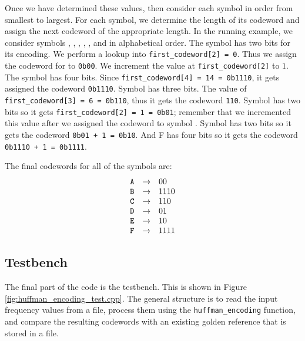 Once we have determined these values, then consider each symbol in order from smallest to largest. For each symbol, we determine the length of its codeword and assign the next codeword of the appropriate length.  In the running example, we consider symbols , , , , , and  in alphabetical order. The symbol  has two bits for its encoding. We perform a lookup into \lstinline{first_codeword[2] = 0}. Thus we assign the codeword for  to \lstinline{0b00}. We increment the value at \lstinline{first_codeword[2]} to $1$. The symbol  has four bits. Since \lstinline{first_codeword[4] = 14 = 0b1110}, it gets assigned the codeword \lstinline{0b1110}. Symbol  has three bits. The value of \lstinline{first_codeword[3] = 6 = 0b110}, thus it gets the codeword \lstinline{110}. Symbol  has two bits so it gets \lstinline{first_codeword[2] = 1 = 0b01}; remember that we incremented this value after we assigned the codeword to symbol . Symbol  has two bits so it gets the codeword \lstinline{0b01 + 1 = 0b10}. And F has four bits so it gets the codeword \lstinline{0b1110 + 1 = 0b1111}.

The final codewords for all of the symbols are:
\begin{equation}
\begin{array} {lll} 
\texttt{A} & \rightarrow & 00 \\
\texttt{B} & \rightarrow & 1110\\
\texttt{C} & \rightarrow  & 110 \\
\texttt{D} & \rightarrow & 01 \\
\texttt{E} & \rightarrow & 10\\
\texttt{F} & \rightarrow & 1111\\
\end{array}
\label{eq:codewords}
\end{equation}

\subsection{Testbench}
\label{sec:huffman_testbench}

The final part of the code is the testbench. This is shown in Figure \ref{fig:huffman_encoding_test.cpp}. The general structure is to read the input frequency values from a file, process them using the \lstinline{huffman_encoding} function, and compare the resulting codewords with an existing golden reference that is stored in a file. 

